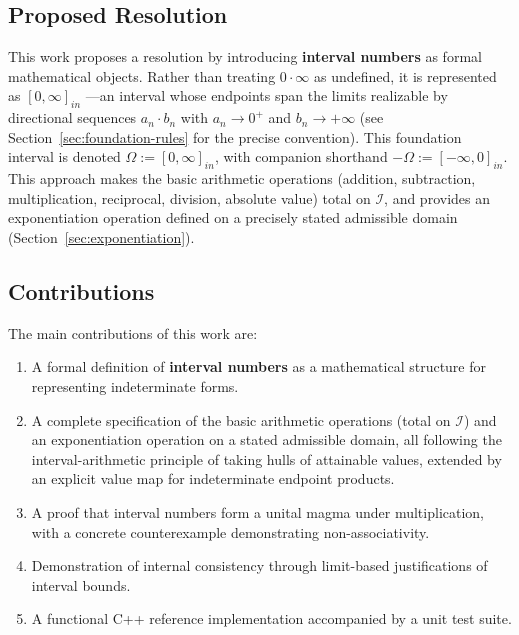 \documentclass[11pt,a4paper]{article}
\theoremstyle{paperdef}
\newcommand{\Iset}{\mathcal{I}}
\newcommand{\inI}[1]{[#1]_{in}}
\begin{document}
\subsection{Proposed Resolution}

This work proposes a resolution by introducing \textbf{interval
numbers} as formal mathematical objects. Rather than treating
$0 \cdot \infty$ as undefined, it is represented as $\inI{0, \infty}$
---an interval whose endpoints span the limits realizable by
directional sequences $a_n \cdot b_n$ with $a_n \to 0^{+}$ and
$b_n \to +\infty$ (see Section~\ref{sec:foundation-rules} for the
precise convention). This foundation interval is denoted
$\Omega := \inI{0, \infty}$, with companion shorthand
$-\Omega := \inI{-\infty, 0}$. This approach makes the basic arithmetic
operations (addition, subtraction, multiplication, reciprocal,
division, absolute value) total on $\Iset$, and provides an
exponentiation operation defined on a precisely stated admissible
domain (Section~\ref{sec:exponentiation}).

\subsection{Contributions}

The main contributions of this work are:
\begin{enumerate}[leftmargin=2em]
  \item A formal definition of \textbf{interval numbers} as a
    mathematical structure for representing indeterminate forms.
  \item A complete specification of the basic arithmetic operations
    (total on $\Iset$) and an exponentiation operation on a stated
    admissible domain, all following the interval-arithmetic principle
    of taking hulls of attainable values, extended by an explicit value
    map for indeterminate endpoint products.
  \item A proof that interval numbers form a unital magma under
    multiplication, with a concrete counterexample demonstrating
    non-associativity.
  \item Demonstration of internal consistency through limit-based
    justifications of interval bounds.
  \item A functional C++ reference implementation accompanied by a
    unit test suite.
\end{enumerate}
\end{document}
